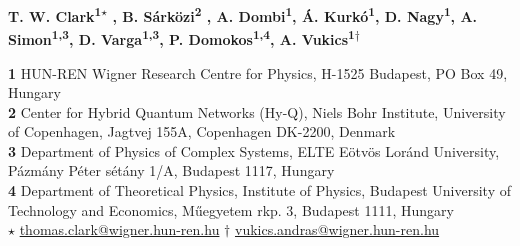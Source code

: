 \documentclass{SciPost}
\begin{document}
 
\pagestyle{SPstyle}
 
\begin{center}{\Large \textbf{\color{scipostdeepblue}{
Wigner Time: a data-oriented approach to experimental timeline creation for quantum science and technology
\\
}}}\end{center}
 
\begin{center}\textbf{
T. W. Clark\textsuperscript{1$\star$}
,
B. Sárközi\textsuperscript{2} 
,
A. Dombi\textsuperscript{1},
Á. Kurkó\textsuperscript{1},
D. Nagy\textsuperscript{1},
A. Simon\textsuperscript{1,3},
D. Varga\textsuperscript{1,3},
P. Domokos\textsuperscript{1,4},
A. Vukics\textsuperscript{1$\dagger$} %
}\end{center}
 
\begin{center}
\textbf{1} HUN-REN Wigner Research Centre for Physics, H-1525 Budapest, PO Box 49, Hungary\\\textbf{2} Center for Hybrid Quantum Networks (Hy-Q), Niels Bohr Institute, University of Copenhagen, Jagtvej 155A, Copenhagen DK-2200, Denmark\\\textbf{3} Department of Physics of Complex Systems, ELTE Eötvös Loránd University, Pázmány Péter sétány 1/A, Budapest 1117, Hungary\\\textbf{4} Department of Theoretical Physics, Institute of Physics, Budapest University of Technology and Economics, Műegyetem rkp. 3, Budapest 1111, Hungary
\\[\baselineskip]
$\star$ \href{mailto:thomas.clark@wigner.hun-ren.hu}{\small thomas.clark@wigner.hun-ren.hu} $\dagger$ \href{mailto:vukics.andras@wigner.hun-ren.hu}{\small vukics.andras@wigner.hun-ren.hu}%
\end{center}
 
\end{document}
